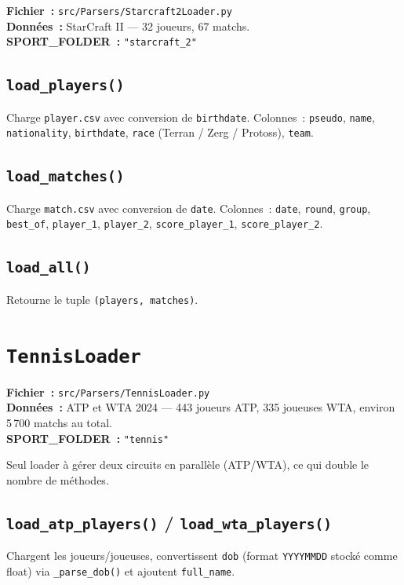 \documentclass[12pt,a4paper]{article}
\begin{document}
\textbf{Fichier~:} \texttt{src/Parsers/Starcraft2Loader.py}\\
\textbf{Données~:} StarCraft II — 32 joueurs, 67 matchs.\\
\textbf{SPORT\_FOLDER~:} \texttt{"starcraft\_2"}

\subsection{\texttt{load\_players()}}
Charge \texttt{player.csv} avec conversion de \texttt{birthdate}. Colonnes~:
\texttt{pseudo}, \texttt{name}, \texttt{nationality}, \texttt{birthdate},
\texttt{race} (Terran / Zerg / Protoss), \texttt{team}.

\subsection{\texttt{load\_matches()}}
Charge \texttt{match.csv} avec conversion de \texttt{date}. Colonnes~:
\texttt{date}, \texttt{round}, \texttt{group}, \texttt{best\_of},
\texttt{player\_1}, \texttt{player\_2}, \texttt{score\_player\_1},
\texttt{score\_player\_2}.

\subsection{\texttt{load\_all()}}
Retourne le tuple \texttt{(players, matches)}.

\section{\texttt{TennisLoader}}

\textbf{Fichier~:} \texttt{src/Parsers/TennisLoader.py}\\
\textbf{Données~:} ATP et WTA 2024 — 443 joueurs ATP, 335 joueuses WTA,
environ 5\,700 matchs au total.\\
\textbf{SPORT\_FOLDER~:} \texttt{"tennis"}

Seul loader à gérer deux circuits en parallèle (ATP/WTA), ce qui double le
nombre de méthodes.

\subsection{\texttt{load\_atp\_players()} / \texttt{load\_wta\_players()}}
Chargent les joueurs/joueuses, convertissent \texttt{dob} (format
\texttt{YYYYMMDD} stocké comme float) via \texttt{\_parse\_dob()} et ajoutent
\texttt{full\_name}.
\end{document}
